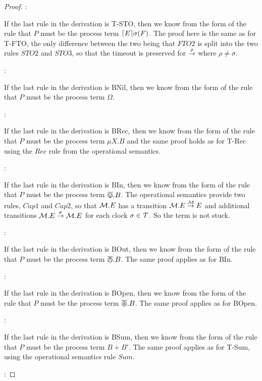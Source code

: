 \begin{proof}
:

\noindent If the last rule in the derivation is T-STO, then we know
from the form of the rule that $P$ must be the process term
$\lceil{E}\rceil {\sigma} ({F})$.  The proof here is the same as for T-FTO,
the only difference between the two being that $FTO2$ is split into
the two rules $STO2$ and $STO3$, so that the timeout is preserved for
$\stackrel{\rho}{\rightarrow}$ where $\rho \ne \sigma$.

:

\noindent If the last rule in the derivation is BNil, then we know
from the form of the rule that $P$ must be the process term $\Omega$.

:

\noindent If the last rule in the derivation is BRec, then we know
from the form of the rule that $P$ must be the process term $\mu X.B$
and the same proof holds as for T-Rec using the $Rec$ rule from the
operational semantics.

:

\noindent If the last rule in the derivation is BIn, then we know from
the form of the rule that $P$ must be the process term $\overline{\varovee}.B$.  The
operational semantics provide two rules, $Cap1$ and $Cap2$, so that
$\text{$\mathcal{M}$}.E$ has a transition $\text{$\mathcal{M}$}.E \stackrel{\text{$\mathcal{M}$}}{\rightarrow} E$ and
additional transitions $\text{$\mathcal{M}$}.E \stackrel{\sigma}{\rightarrow} \text{$\mathcal{M}$}.E$ for each
clock $\sigma \in \text{$\mathcal{T}$}$.  So the term is not stuck.

:

\noindent If the last rule in the derivation is BOut, then we know
from the form of the rule that $P$ must be the process term $\overline{\varowedge}.B$.
The same proof applies as for BIn.

:

\noindent If the last rule in the derivation is BOpen, then we know
from the form of the rule that $P$ must be the process term
$\overline{\varoast}.B$.  The same proof applies as for BOpen.

:

\noindent If the last rule in the derivation is BSum, then we know
from the form of the rule that $P$ must be the process term $B + B'$.
The same proof applies as for T-Sum, using the operational semantics
rule $Sum$.

:


\end{proof}
